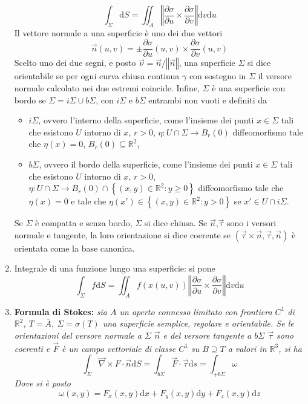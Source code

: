\documentclass[a4paper,11pt]{article}
\newcommand{\norm}[1]{\left\Vert#1\right\Vert}
\begin{document}
\begin{enumerate}
	\[\int_{\Sigma}\mathrm{d}S=\iint_A\norm{\frac{\partial \sigma}{\partial u}\times\frac{\partial \sigma}{\partial v}}\mathrm{d}v\mathrm{d}u\]
	Il vettore normale a una superficie è uno dei due vettori 
	\[\vec{n}(u,v)=\pm\frac{\partial \sigma}{\partial u}(u,v)\times\frac{\partial \sigma}{\partial v}(u,v)\]
	Scelto uno dei due segni, e posto $\vec{\nu}=\vec{n}/\norm{\vec{n}}$, una superficie $\Sigma$ si dice orientabile se per ogni curva chiusa continua $\gamma$ con sostegno in $\Sigma$ il versore normale calcolato nei due estremi coincide.
	Infine, $\Sigma$ è una superficie con bordo se $\Sigma=i\Sigma\cup b\Sigma$, con $i\Sigma$ e $b\Sigma$ entrambi non vuoti e definiti da
	\begin{itemize}
		\item $i\Sigma$, ovvero l'interno della superficie, come l'insieme dei punti $x\in\Sigma$ tali che esistono $U$ intorno di $x$, $r>0$, $\eta\colon U\cap\Sigma\to B_r(0)$ diffeomorfismo tale che $\eta(x)=0$, $B_r(0)\subseteq\mathbb{R}^2$,
		\item $b\Sigma$, ovvero il bordo della superficie, come l'insieme dei punti $x\in\Sigma$ tali che esistono $U$ intorno di $x$, $r>0$, $\eta\colon U\cap\Sigma\to B_r(0)\cap\left\{(x,y)\in\mathbb{R}^2:y\geq0\right\}$ diffeomorfismo tale che $\eta(x)=0$ e tale che $\eta(x')\in\left\{(x,y)\in\mathbb{R}^2:y>0\right\}$ se $x'\in U\cap i\Sigma$.
	\end{itemize}
	Se $\Sigma$ è compatta e senza bordo, $\Sigma$ si dice chiusa.
	Se $\vec{n}$,$\vec{\tau}$ sono i versori normale e tangente, la loro orientazione si dice coerente se $(\vec\tau\times\vec{n},\vec{\tau},\vec{n})$ è orientata come la base canonica.
	\item Integrale di una funzione lungo una superficie: si pone
	\[\int_{\Sigma}f\mathrm{d}S=\iint_Af(x(u,v))\norm{\frac{\partial \sigma}{\partial u}\times\frac{\partial \sigma}{\partial v}}\mathrm{d}v\mathrm{d}u\]
	\item \textbf{Formula di Stokes:} \textit{sia $A$ un aperto connesso limitato con frontiera $C^1$ di $\mathbb{R}^2$, $T=\overline{A}$, $\Sigma=\sigma(T)$ una superficie semplice, regolare e orientabile. Se le orientazioni del versore normale a $\Sigma$ $\vec{n}$ e del versore tangente a $b\Sigma$ $\vec{\tau}$ sono coerenti e $\vec{F}$ è un campo vettoriale di classe $C^1$ su $B\supseteq T$ a valori in $\mathbb{R}^3$, si ha
	\[\int_{\Sigma}\vec{\nabla}\times F\cdot\vec{n}\mathrm{d}S=\int_{b\Sigma}\vec{F}\cdot\vec{\tau}\mathrm{d}s=\int_{+b\Sigma}\omega\]
	Dove si è posto
	\[\omega(x,y)=F_x(x,y)\mathrm{d}x+F_y(x,y)\mathrm{d}y+F_z(x,y)\mathrm{d}z\]}
	

\end{enumerate}
\end{document}
